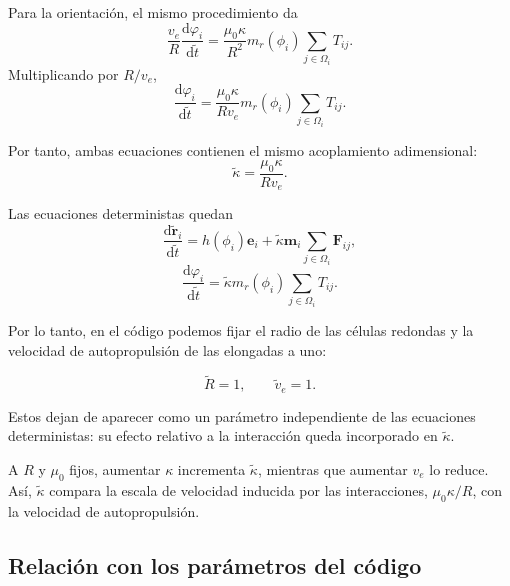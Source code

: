 \documentclass[11pt,a4paper]{article}
\begin{document}
Para la orientación, el mismo procedimiento da
\begin{equation}
	\frac{v_e}{R}
	\frac{\mathrm{d}\varphi_i}{\mathrm{d}\widetilde t}
	=
	\frac{\mu_0 \kappa}{R^2}
	m_r(\phi_i)
	\sum_{j\in\Omega_i}T_{ij}.
\end{equation}
Multiplicando por $R/v_e$,
\begin{equation}
	\frac{\mathrm{d}\varphi_i}{\mathrm{d}\widetilde t}
	=
	\frac{\mu_0 \kappa}{Rv_e}
	m_r(\phi_i)
	\sum_{j\in\Omega_i}T_{ij}.
	\label{eq:scaled_rotation}
\end{equation}

Por tanto, ambas ecuaciones contienen el mismo
acoplamiento adimensional:
\begin{equation}
	\boxed{
		\widetilde\kappa=\frac{\mu_0 \kappa}{Rv_e}
	}.
	\label{eq:kappa_definition}
\end{equation}

Las ecuaciones deterministas quedan
\begin{equation}
	\boxed{
		\frac{\mathrm{d}\widetilde{\bm r}_i}
		{\mathrm{d}\widetilde t}
		=
		h(\phi_i)\bm e_i
		+
		\widetilde\kappa\bm m_i
		\sum_{j\in\Omega_i}\bm F_{ij}
	},
\end{equation}
\begin{equation}
	\boxed{
		\frac{\mathrm{d}\varphi_i}{\mathrm{d}\widetilde t}
		=
		\widetilde\kappa m_r(\phi_i)
		\sum_{j\in\Omega_i}T_{ij}
	}.
\end{equation}

Por lo tanto, en el código podemos fijar el radio de las células redondas y la velocidad de autopropulsión de las elongadas a uno:

\begin{equation}
	\widetilde R=1,
	\qquad
	\widetilde v_e=1.
\end{equation}

Estos dejan de aparecer como un parámetro independiente de las ecuaciones deterministas: su efecto relativo a la interacción queda incorporado en $\widetilde\kappa$.

A $R$ y $\mu_0$ fijos, aumentar $\kappa$ incrementa $\widetilde\kappa$, mientras que aumentar $v_e$ lo reduce. Así, $\widetilde\kappa$ compara la escala de velocidad inducida por las interacciones, $\mu_0\kappa/R$, con la velocidad de autopropulsión.

\subsection{Relación con los parámetros del código}
\end{document}
